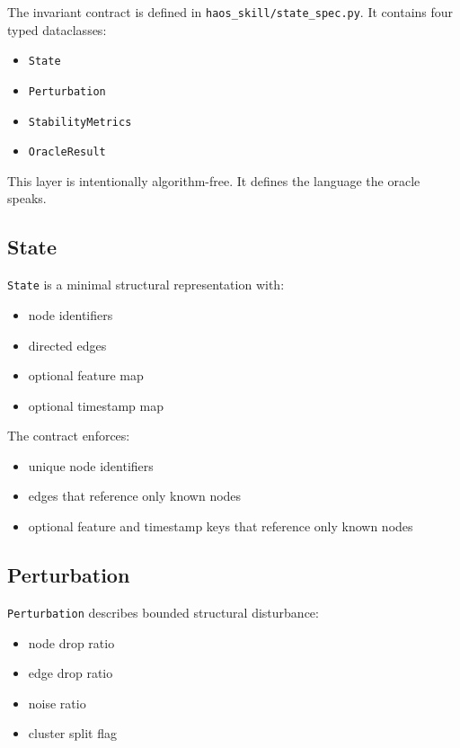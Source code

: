 \documentclass[11pt]{article}
\begin{document}
The invariant contract is defined in \texttt{haos\_skill/state\_spec.py}.
It contains four typed dataclasses:

\begin{itemize}
\item \texttt{State}
\item \texttt{Perturbation}
\item \texttt{StabilityMetrics}
\item \texttt{OracleResult}
\end{itemize}

This layer is intentionally algorithm-free.
It defines the language the oracle speaks.

\subsection{State}

\texttt{State} is a minimal structural representation with:

\begin{itemize}
\item node identifiers
\item directed edges
\item optional feature map
\item optional timestamp map
\end{itemize}

The contract enforces:

\begin{itemize}
\item unique node identifiers
\item edges that reference only known nodes
\item optional feature and timestamp keys that reference only known nodes
\end{itemize}

\subsection{Perturbation}

\texttt{Perturbation} describes bounded structural disturbance:

\begin{itemize}
\item node drop ratio
\item edge drop ratio
\item noise ratio
\item cluster split flag
\end{itemize}
\end{document}
